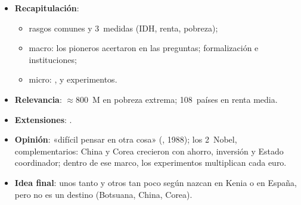 \documentclass{article}
\begin{document}
\begin{columnas}
\begin{itemize}
\item \textbf{Recapitulación}:
  \begin{itemize}
  \item rasgos comunes y 3~medidas (IDH, renta, pobreza);
  \item macro: los pioneros acertaron en las preguntas; formalización e instituciones;
  \item micro: ,  y experimentos.
  \end{itemize}
\item \textbf{Relevancia}: $\approx$800~M en pobreza extrema; 108~países en renta media.
\item \textbf{Extensiones}:      .
\item \textbf{Opinión}: «difícil pensar en otra cosa» (, 1988); los 2~Nobel, complementarios: China y Corea crecieron con ahorro, inversión y Estado coordinador; dentro de ese marco, los experimentos multiplican cada euro.
\item \textbf{Idea final}: unos tanto y otros tan poco según nazcan en Kenia o en España, pero no es un destino (Botsuana, China, Corea).
\end{itemize}


\end{columnas}
\end{document}
